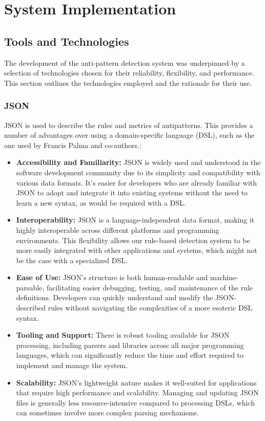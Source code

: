 \documentclass[12pt, times]{article}
\begin{document}
	\clearpage
	\newpage
	
	
	\section{System Implementation}
	
	\subsection{Tools and Technologies}
	
		\hspace*{5mm}The development of the anti-pattern detection system was underpinned by a selection of technologies chosen for their reliability, flexibility, and performance. This section outlines the technologies employed and the rationale for their use.
		
		\subsubsection*{JSON}
		
		\hspace*{5mm} JSON is used to describe the rules and metrics of antipatterns. This provides a number of advantages over using a domain-specific language (DSL), such as the one used by Francis Palma and co-authors.:
		
			\begin{itemize}
			\item \textbf{Accessibility and Familiarity:} JSON is widely used and understood in the software development community due to its simplicity and compatibility with various data formats. It's easier for developers who are already familiar with JSON to adopt and integrate it into existing systems without the need to learn a new syntax, as would be required with a DSL.
			\item \textbf{Interoperability:} JSON is a language-independent data format, making it highly interoperable across different platforms and programming environments. This flexibility allows our rule-based detection system to be more easily integrated with other applications and systems, which might not be the case with a specialized DSL.
			\item \textbf{Ease of Use:} JSON's structure is both human-readable and machine-parsable, facilitating easier debugging, testing, and maintenance of the rule definitions. Developers can quickly understand and modify the JSON-described rules without navigating the complexities of a more esoteric DSL syntax.
			\item \textbf{Tooling and Support:} There is robust tooling available for JSON processing, including parsers and libraries across all major programming languages, which can significantly reduce the time and effort required to implement and manage the system.
			\item \textbf{Scalability:} JSON's lightweight nature makes it well-suited for applications that require high performance and scalability. Managing and updating JSON files is generally less resource-intensive compared to processing DSLs, which can sometimes involve more complex parsing mechanisms.
		\end{itemize}
		
\end{document}
